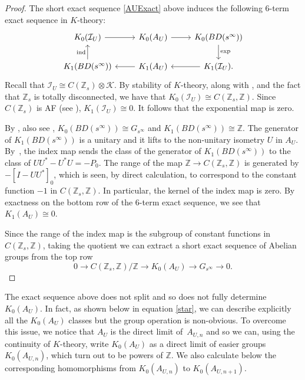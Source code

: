 \documentclass[10pt,a4paper]{amsart}
\newcommand{\Z}{{\mathbb Z}}
\numberwithin{equation}{section}
\begin{document}
\begin{proof}
The short exact sequence \eqref{AUExact} above induces the following $6$-term exact sequence in $K$-theory:
\begin{equation*}
\begin{tikzcd}
 K_0(\mathcal{I}_U) \arrow{r} & K_0(A_U) \arrow{r} & K_0(BD(s^\infty)) \arrow{d}{\textup{exp}} \\
 K_1(BD(s^\infty)) \arrow{u}{\textup{ind}} & K_1(A_U) \arrow{l} & K_1(\mathcal{I}_U) \arrow{l}.
\end{tikzcd}
\end{equation*}
Recall that $\mathcal{I}_U \cong C(\Z_s) \otimes \mathcal{K}$. By stability of $K$-theory, along with \cite[Exercise 3.4]{RLL}, and the fact that $\Z_s$ is totally disconnected, we have that
$
K_0(\mathcal{I}_U) \cong C(\Z_s,\Z)$.
Since $C(\Z_s)$ is AF (see \cite[Example III.2.5]{KD}),
$
K_1(\mathcal{I}_U) \cong 0$.
It follows that the exponential map is zero.

By \cite[Exercise 10.11.4\,(b)]{Blackadar}, also see \cite{KMP2},
$K_0(BD(s^\infty)) \cong G_{s^\infty}$ and $ K_1(BD(s^\infty)) \cong \Z$.
The generator of $K_1(BD(s^\infty))$ is a unitary and it lifts to the non-unitary isometry $U$ in $A_U$. By~\cite[Proposition~9.2.4]{RLL}, the index map sends the class of the generator of $K_1(BD(s^\infty))$ to the class of $UU^*-U^*U=-P_0$. The range of the map $\Z \to C(\Z_s , \Z)$ is generated by $-[I - UU^*]_0$, which is seen, by direct calculation, to correspond to the constant function $-1$ in $C(\Z_s, \Z)$. In particular, the kernel of the index map is zero. By exactness on the bottom row of the $6$-term exact sequence, we see that
$
K_1(A_U) \cong 0$.


Since the range of the index map is the subgroup of constant functions in $C(\Z_s, \Z)$, taking the quotient we can extract a short exact sequence of Abelian groups from the top row
\begin{equation*}
0 \to C(\Z_s, \Z)/\Z \to K_0(A_U) \to G_{s^\infty} \to 0.\tag*{\qed}
\end{equation*} \renewcommand{\qed}{}
\end{proof}

The exact sequence above does not split and so does not fully determine $K_0(A_U)$. In fact, as shown below in equation \eqref{star}, we can describe explicitly all the $K_0(A_U)$ classes but the group operation is non-obvious. To overcome this issue, we notice that $A_U$ is the direct limit of~$A_{U,n}$ and so we can, using the continuity of $K$-theory, write $K_0(A_U)$ as a direct limit of easier groups $K_0(A_{U,n})$, which turn out to be powers of $\Z$. We also calculate below the corresponding homomorphisms from $K_0(A_{U,n})$ to $K_0(A_{U,n+1})$.
\end{document}
